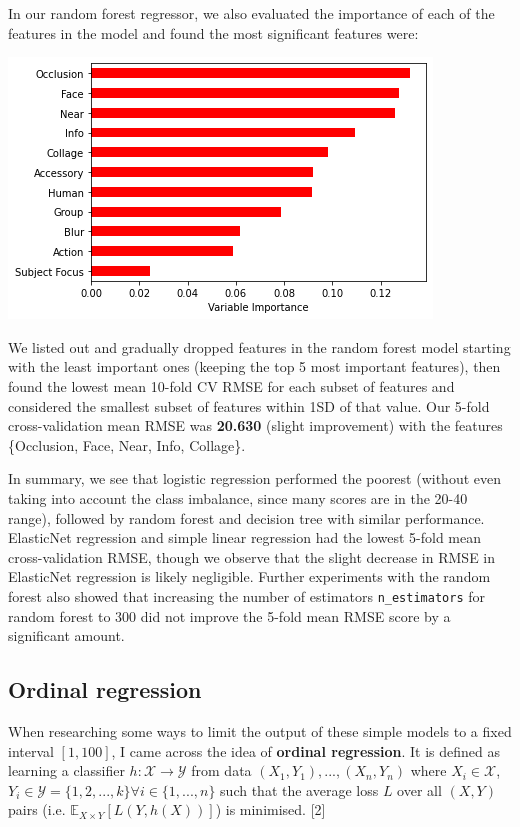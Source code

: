 \documentclass[12pt]{article}
\begin{document}
In our random forest regressor, we also evaluated the importance of each of the features in the model and found the most significant features were:

\includegraphics[scale=0.4]{6_feature_importance}

We listed out and gradually dropped features in the random forest model starting with the least important ones (keeping the top 5 most important features), then found the lowest mean 10-fold CV RMSE for each subset of features and considered the smallest subset of features within 1SD of that value. Our 5-fold cross-validation mean RMSE was \textbf{20.630} (slight improvement) with the features \{Occlusion, Face, Near, Info, Collage\}.\newline

In summary, we see that logistic regression performed the poorest (without even taking into account the class imbalance, since many scores are in the 20-40 range), followed by random forest and decision tree with similar performance. ElasticNet regression and simple linear regression had the lowest 5-fold mean cross-validation RMSE, though we observe that the slight decrease in RMSE in ElasticNet regression is likely negligible. Further experiments with the random forest also showed that increasing the number of estimators \texttt{n\_estimators} for random forest to 300 did not improve the 5-fold mean RMSE score by a significant amount.

\subsection{Ordinal regression}

When researching some ways to limit the output of these simple models to a fixed interval $[1,100]$, I came across the idea of \textbf{ordinal regression}. It is defined as learning a classifier $h:\mathcal{X} \rightarrow \mathcal{Y}$ from data $(X_1,Y_1),...,(X_n,Y_n)$ where $X_i\in \mathcal{X}$, $Y_i\in \mathcal{Y}=\{1,2,...,k\} \forall i\in \{1,...,n\}$ such that the average loss $L$ over all $(X,Y)$ pairs  (i.e. $\mathbb{E}_{X\times Y}[L(Y,h(X))]$) is minimised. [2]\newline
\end{document}
